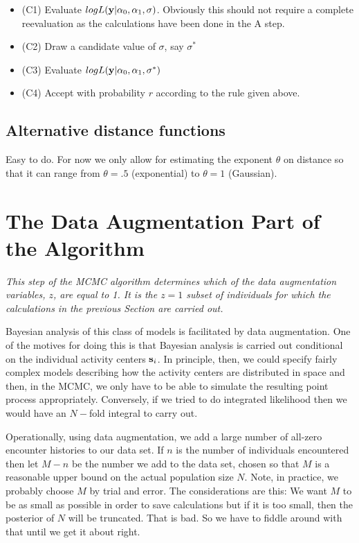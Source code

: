 \documentclass[12pt]{article}
\begin{document}
\begin{itemize}
\item (C1) Evaluate $logL({\bf y}|\alpha_{0},\alpha_{1},\sigma)$. Obviously
 this should not require a complete reevaluation as the calculations
 have been done in the A step.

\item (C2)  Draw a candidate value of $\sigma$, say $\sigma^{*}$

\item (C3) Evaluate $logL({\bf y}|\alpha_{0},\alpha_{1},\sigma^{*})$

\item (C4) Accept with probability $r$ according to the rule given above.
\end{itemize}



\subsection{Alternative distance functions}

Easy to do. For now we only allow for estimating the exponent $\theta$
on distance so that it can range from $\theta = .5$ (exponential) to
$\theta = 1$ (Gaussian).  


\section{The Data Augmentation Part of the Algorithm}

{\it 
This step of the MCMC algorithm determines which of the data
augmentation variables, $z$, are equal to 1. It is the $z=1$ subset of
individuals for which the calculations in the previous Section are
carried out.
}


Bayesian analysis of this class of models is facilitated by data
augmentation.  One of the motives for doing this is that Bayesian
analysis is carried out conditional on the individual activity centers
${\bf s}_{i}$. In principle, then, we could specify fairly complex
models describing how the activity centers are distributed in space
and then, in the MCMC, we only have to be able to simulate the
resulting point process appropriately.  Conversely, if we tried to do
integrated likelihood then we would have an $N-$fold integral to carry
out.

Operationally, using data augmentation, we add a large number of
all-zero encounter histories to our data set. If $n$ is the number of
individuals encountered then let $M-n$ be the number we add to the
data set, chosen so that $M$ is a reasonable upper bound on the actual
population size $N$. Note, in practice, we probably choose $M$ by
trial and error. The considerations are this: We want $M$ to be as
small as possible in order to save calculations but if it is too
small, then the posterior of $N$ will be truncated. That is bad.  So
we have to fiddle around with that until we get it about right.
\end{document}
